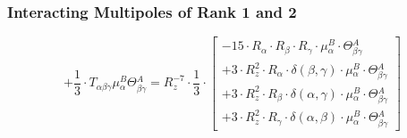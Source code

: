 \documentclass{article}
\begin{document}
\subsubsection*{Interacting Multipoles of Rank 1 and 2}
\begin{equation}
+ \frac{1}{3} \cdot T_{\alpha{}\beta{}\gamma{}} \mu{}^{B}_{\alpha{}} \Theta{}^{A}_{\beta{}\gamma{}} = R_{z}^{-7} \cdot \frac{1}{3} \cdot  \left[ \begin{array}{c} 
 		- 15 \cdot R_{\alpha{}} \cdot R_{\beta{}} \cdot R_{\gamma{}} \cdot \mu{}^{B}_{\alpha{}} \cdot \Theta{}^{A}_{\beta{}\gamma{}} 
 \\[0.2em] 		 + 3 \cdot R_{z}^{2} \cdot R_{\alpha{}} \cdot \delta{}\left(\beta{}, \gamma{}\right) \cdot \mu{}^{B}_{\alpha{}} \cdot \Theta{}^{A}_{\beta{}\gamma{}} 
 \\[0.2em] 		 + 3 \cdot R_{z}^{2} \cdot R_{\beta{}} \cdot \delta{}\left(\alpha{}, \gamma{}\right) \cdot \mu{}^{B}_{\alpha{}} \cdot \Theta{}^{A}_{\beta{}\gamma{}} 
 \\[0.2em] 		 + 3 \cdot R_{z}^{2} \cdot R_{\gamma{}} \cdot \delta{}\left(\alpha{}, \beta{}\right) \cdot \mu{}^{B}_{\alpha{}} \cdot \Theta{}^{A}_{\beta{}\gamma{}}
 \end{array}\right] 
\end{equation}
\end{document}

